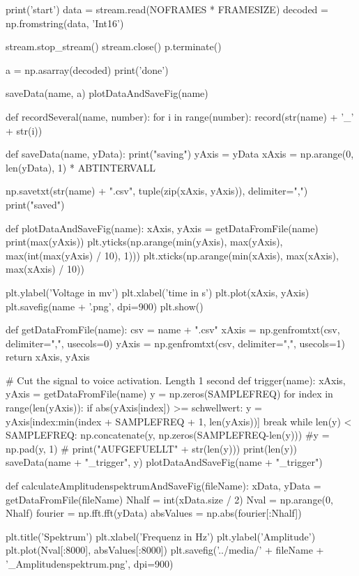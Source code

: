     print('start')
    data = stream.read(NOFRAMES * FRAMESIZE)
    decoded = np.fromstring(data, 'Int16')

    stream.stop_stream()
    stream.close()
    p.terminate()

    a = np.asarray(decoded)
    print('done')

    saveData(name, a)
    plotDataAndSaveFig(name)


def recordSeveral(name, number):
    for i in range(number):
        record(str(name) + '_' + str(i))


def saveData(name, yData):
    print("saving")
    yAxis = yData
    xAxis = np.arange(0, len(yData), 1) * ABTINTERVALL

    np.savetxt(str(name) + ".csv", tuple(zip(xAxis, yAxis)), delimiter=",")
    print("saved")


def plotDataAndSaveFig(name):
    xAxis, yAxis = getDataFromFile(name)
    print(max(yAxis))
    plt.yticks(np.arange(min(yAxis), max(yAxis), max(int(max(yAxis) / 10), 1)))
    plt.xticks(np.arange(min(xAxis), max(xAxis), max(xAxis) / 10))

    plt.ylabel('Voltage in mv')
    plt.xlabel('time in s')
    plt.plot(xAxis, yAxis)
    plt.savefig(name + '.png', dpi=900)
    plt.show()


def getDataFromFile(name):
    csv = name + ".csv"
    xAxis = np.genfromtxt(csv, delimiter=",", usecols=0)
    yAxis = np.genfromtxt(csv, delimiter=",", usecols=1)
    return xAxis, yAxis


# Cut the signal to voice activation. Length 1 second
def trigger(name):
    xAxis, yAxis = getDataFromFile(name)
    y = np.zeros(SAMPLEFREQ)
    for index in range(len(yAxis)):
        if abs(yAxis[index]) >= schwellwert:
            y = yAxis[index:min(index + SAMPLEFREQ + 1, len(yAxis))]
            break
    while len(y) < SAMPLEFREQ:
        np.concatenate(y, np.zeros(SAMPLEFREQ-len(y)))
        #y = np.pad(y, 1)
        # print("AUFGEFUELLT" + str(len(y)))
    print(len(y))
    saveData(name + "_trigger", y)
    plotDataAndSaveFig(name + "_trigger")


def calculateAmplitudenspektrumAndSaveFig(fileName):
    xData, yData = getDataFromFile(fileName)
    Nhalf = int(xData.size / 2)
    Nval = np.arange(0, Nhalf)
    fourier = np.fft.fft(yData)
    absValues = np.abs(fourier[:Nhalf])

    plt.title('Spektrum')
    plt.xlabel('Frequenz in Hz')
    plt.ylabel('Amplitude')
    plt.plot(Nval[:8000], absValues[:8000])
    plt.savefig('../media/' + fileName + '_Amplitudenspektrum.png', dpi=900)



